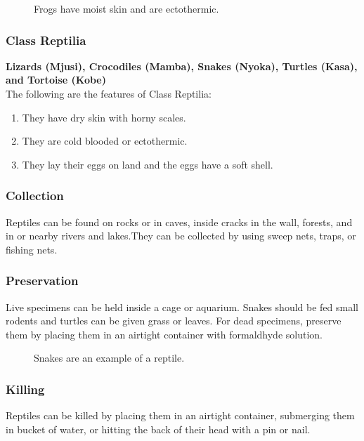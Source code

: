 \begin{figure}[h]
\begin{center}
\def\svgwidth{6cm}

\caption{Frogs have moist skin and are ectothermic.}
\label{fig:anae-resp3}
\end{center}
\end{figure}

\subsubsection{Class Reptilia}
\textbf{Lizards (Mjusi), Crocodiles (Mamba), Snakes (Nyoka), Turtles (Kasa), and Tortoise (Kobe)}\\The following are the features of Class Reptilia:
\begin{enumerate}
\item{They have dry skin with horny scales.}
\item{They are cold blooded or ectothermic.}
\item{They lay their eggs on land and the eggs have a soft shell.}
\end{enumerate}

\subsubsection{Collection}
Reptiles can be found on rocks or in caves, inside cracks in the wall, forests, and in or nearby rivers and lakes.They can be collected by using sweep nets, traps, or fishing nets.

\subsubsection{Preservation} 
Live specimens can be held inside a cage or aquarium. Snakes should be fed small rodents and turtles can be given grass or leaves. For dead specimens, preserve them by placing them in an airtight container with formaldhyde solution.

\begin{figure}[h]
\begin{center}
\def\svgwidth{8cm}

\caption{Snakes are an example of a reptile.}
\label{fig:snake}
\end{center}
\end{figure}
\subsubsection{Killing}
Reptiles can be killed by placing them in an airtight container, submerging them in bucket of water, or hitting the back of their head with a pin or nail.

